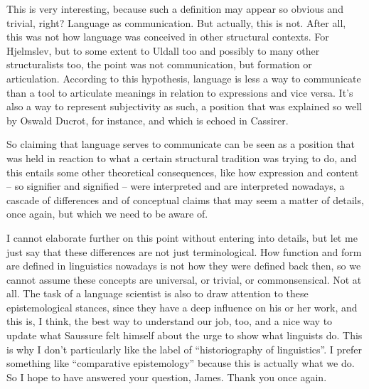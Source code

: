 This is very interesting, because such a definition may appear so obvious and trivial, right? Language as communication. But actually, this is not. After all, this was not how language was conceived in other structural contexts. For Hjelmslev, but to some extent to Uldall too and possibly to many other structuralists too, the point was not communication, but formation or articulation. According to this hypothesis, language is less a way to communicate than a tool to articulate meanings in relation to expressions and vice versa. It’s also a way to represent subjectivity as such, a position that was explained so well by Oswald Ducrot, for instance, and which is echoed in Cassirer.

So claiming that language serves to communicate can be seen as a position that was held in reaction to what a certain structural tradition was trying to do, and this entails some other theoretical consequences, like how expression and content – so signifier and signified – were interpreted and are interpreted nowadays, a cascade of differences and of conceptual claims that may seem a matter of details, once again, but which we need to be aware of. 

I cannot elaborate further on this point without entering into details, but let me just say that these differences are not just terminological. How function and form are defined in linguistics nowadays is not how they were defined back then, so we cannot assume these concepts are universal, or trivial, or commonsensical. Not at all. The task of a language scientist is also to draw attention to these epistemological stances, since they have a deep influence on his or her work, and this is, I think, the best way to understand our job, too, and a nice way to update what Saussure felt himself about the urge to show what linguists do. This is why I don’t particularly like the label of “historiography of linguistics”. I prefer something like “comparative epistemology” because this is actually what we do. So I hope to have answered your question, James. Thank you once again.

